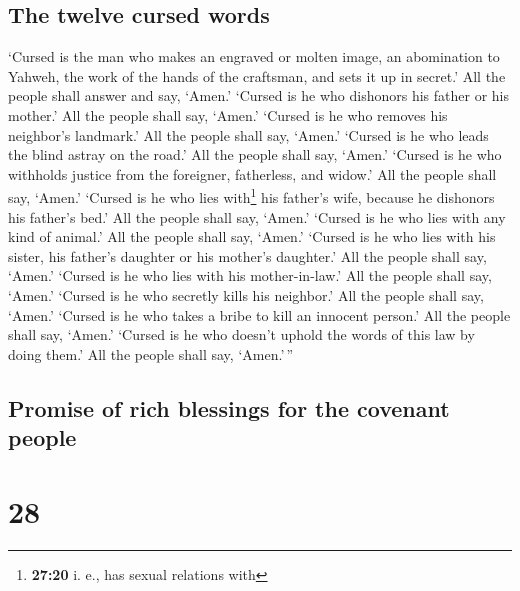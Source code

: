 \hypertarget{the-twelve-cursed-words}{%
\subsection{The twelve cursed words}\label{the-twelve-cursed-words}}

 `Cursed is the man who makes an engraved or molten
image, an abomination to Yahweh, the work of the hands of the craftsman,
and sets it up in secret.' All the people shall answer and say, `Amen.'
 `Cursed is he who dishonors his father or his mother.'
All the people shall say, `Amen.'  `Cursed is he who
removes his neighbor's landmark.' All the people shall say, `Amen.'
 `Cursed is he who leads the blind astray on the road.'
All the people shall say, `Amen.'  `Cursed is he who
withholds justice from the foreigner, fatherless, and widow.' All the
people shall say, `Amen.'  `Cursed is he who lies
with\footnote{\textbf{27:20} i. e., has sexual relations with} his
father's wife, because he dishonors his father's bed.' All the people
shall say, `Amen.'  `Cursed is he who lies with any kind
of animal.' All the people shall say, `Amen.'  `Cursed is
he who lies with his sister, his father's daughter or his mother's
daughter.' All the people shall say, `Amen.'  `Cursed is
he who lies with his mother-in-law.' All the people shall say, `Amen.'
 `Cursed is he who secretly kills his neighbor.' All the
people shall say, `Amen.'  `Cursed is he who takes a
bribe to kill an innocent person.' All the people shall say, `Amen.'
 `Cursed is he who doesn't uphold the words of this law
by doing them.' All the people shall say, `Amen.'\,''

\hypertarget{promise-of-rich-blessings-for-the-covenant-people}{%
\subsection{Promise of rich blessings for the covenant
people}\label{promise-of-rich-blessings-for-the-covenant-people}}

\hypertarget{section-27}{%
\section{28}\label{section-27}}

